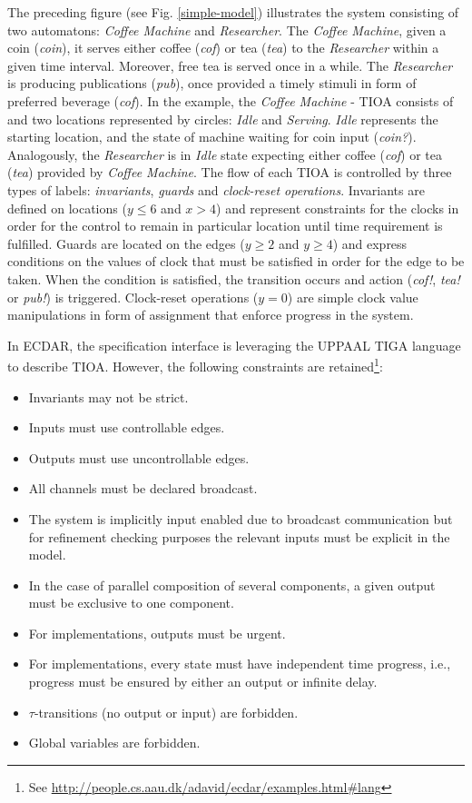 The preceding figure (see Fig. \ref{simple-model}) illustrates the system
consisting of two automatons: \emph{Coffee Machine} and \emph{Researcher}.  The
\emph{Coffee Machine}, given a coin (\emph{coin}), it serves either coffee
(\emph{cof}) or tea (\emph{tea}) to the \emph{Researcher} within a given time
interval. Moreover, free tea is served once in a while. The \emph{Researcher} is
producing publications (\emph{pub}), once provided a timely stimuli in form of
preferred beverage (\emph{cof}).  In the example, the \emph{Coffee Machine} -
TIOA consists of and two locations represented by circles: \emph{Idle} and
\emph{Serving}. \emph{Idle} represents the starting location, and the state of
machine waiting for coin input (\emph{coin?}). Analogously, the
\emph{Researcher} is in \emph{Idle} state expecting either coffee (\emph{cof})
or tea (\emph{tea}) provided by \emph{Coffee Machine}.  The flow of each TIOA is
controlled by three types of labels: \emph{invariants}, \emph{guards} and
\emph{clock-reset operations}.  Invariants are defined on locations ($y\leq 6$
and $x > 4$) and represent constraints for the clocks in order for the
control to remain in particular location until time requirement is fulfilled.
Guards are located on the edges ($y\geq 2$ and $y\geq 4$) and express conditions
on the values of clock that must be satisfied in order for the edge to be
taken. When the condition is satisfied, the transition occurs and action
(\emph{cof!}, \emph{tea!} or \emph{pub!}) is triggered. Clock-reset operations
($y=0$) are simple clock value manipulations in form of assignment that enforce
progress in the system.

In ECDAR, the specification interface is leveraging the UPPAAL TIGA language
\cite{behrmann_uppaal-tiga:_2006} to describe TIOA. However, the following
constraints are retained\footnote{See
  \url{http://people.cs.aau.dk/adavid/ecdar/examples.html#lang}}:


\begin{itemize}
\item Invariants may not be strict.
\item Inputs must use controllable edges.
\item Outputs must use uncontrollable edges.
\item All channels must be declared broadcast.
\item The system is implicitly input enabled due to broadcast communication but
  for refinement checking purposes the relevant inputs must be explicit in the
  model.
\item In the case of parallel composition of several components, a given output
  must be exclusive to one component.
\item For implementations, outputs must be urgent.
\item For implementations, every state must have independent time progress,
  i.e., progress must be ensured by either an output or infinite delay.
\item $\tau$-transitions (no output or input) are forbidden.
\item Global variables are forbidden.
\end{itemize}

